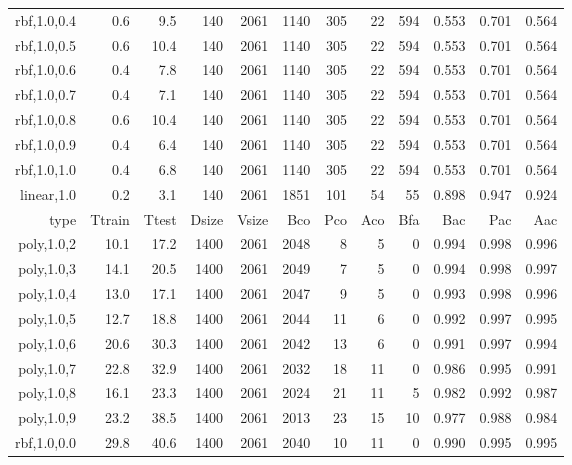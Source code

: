 \begin{longtable}{r|r|r|r|r|r|r|r|r|r|r|r}
  rbf,1.0,0.4  &     0.6 &     9.5 &   140 &  2061 &  1140 &   305 &    22 &   594 & 0.553 & 0.701 & 0.564 \\
  rbf,1.0,0.5  &     0.6 &    10.4 &   140 &  2061 &  1140 &   305 &    22 &   594 & 0.553 & 0.701 & 0.564 \\
  rbf,1.0,0.6  &     0.4 &     7.8 &   140 &  2061 &  1140 &   305 &    22 &   594 & 0.553 & 0.701 & 0.564 \\
  rbf,1.0,0.7  &     0.4 &     7.1 &   140 &  2061 &  1140 &   305 &    22 &   594 & 0.553 & 0.701 & 0.564 \\
  rbf,1.0,0.8  &     0.6 &    10.4 &   140 &  2061 &  1140 &   305 &    22 &   594 & 0.553 & 0.701 & 0.564 \\
  rbf,1.0,0.9  &     0.4 &     6.4 &   140 &  2061 &  1140 &   305 &    22 &   594 & 0.553 & 0.701 & 0.564 \\
  rbf,1.0,1.0  &     0.4 &     6.8 &   140 &  2061 &  1140 &   305 &    22 &   594 & 0.553 & 0.701 & 0.564 \\
   linear,1.0  &     0.2 &     3.1 &   140 &  2061 &  1851 &   101 &    54 &    55 & 0.898 & 0.947 & 0.924 \\
          type &  Ttrain &   Ttest & Dsize & Vsize &   Bco &   Pco &   Aco &   Bfa &   Bac &   Pac &   Aac \\
   poly,1.0,2  &    10.1 &    17.2 &  1400 &  2061 &  2048 &     8 &     5 &     0 & 0.994 & 0.998 & 0.996 \\
   poly,1.0,3  &    14.1 &    20.5 &  1400 &  2061 &  2049 &     7 &     5 &     0 & 0.994 & 0.998 & 0.997 \\
   poly,1.0,4  &    13.0 &    17.1 &  1400 &  2061 &  2047 &     9 &     5 &     0 & 0.993 & 0.998 & 0.996 \\
   poly,1.0,5  &    12.7 &    18.8 &  1400 &  2061 &  2044 &    11 &     6 &     0 & 0.992 & 0.997 & 0.995 \\
   poly,1.0,6  &    20.6 &    30.3 &  1400 &  2061 &  2042 &    13 &     6 &     0 & 0.991 & 0.997 & 0.994 \\
   poly,1.0,7  &    22.8 &    32.9 &  1400 &  2061 &  2032 &    18 &    11 &     0 & 0.986 & 0.995 & 0.991 \\
   poly,1.0,8  &    16.1 &    23.3 &  1400 &  2061 &  2024 &    21 &    11 &     5 & 0.982 & 0.992 & 0.987 \\
   poly,1.0,9  &    23.2 &    38.5 &  1400 &  2061 &  2013 &    23 &    15 &    10 & 0.977 & 0.988 & 0.984 \\
  rbf,1.0,0.0  &    29.8 &    40.6 &  1400 &  2061 &  2040 &    10 &    11 &     0 & 0.990 & 0.995 & 0.995 \\

\end{longtable}
